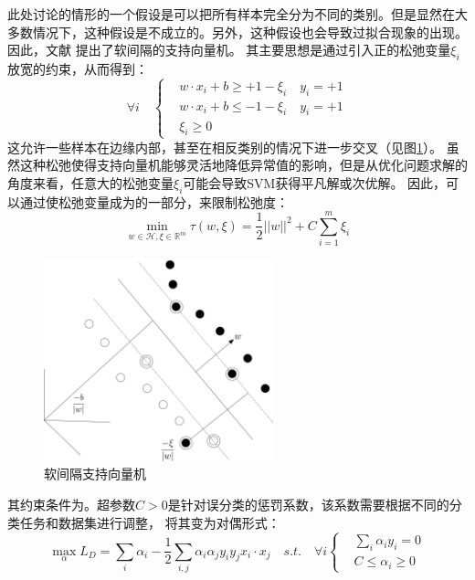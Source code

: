 此处讨论的情形的一个假设是可以把所有样本完全分为不同的类别。但是显然在大多数情况下，这种假设是不成立的。另外，这种假设也会导致过拟合现象的出现。因此，文献 \cite{cortes1995support} 提出了软间隔的支持向量机。
其主要思想是通过引入正的松弛变量$\xi_i$放宽的约束，从而得到：
\begin{equation}
	\forall i \quad
	\left\{
	 \begin{aligned}
	&w\cdot x_i + b \geq +1-\xi_i \quad y_i=+1  \\
	&w\cdot x_i + b \leq -1-\xi_i \quad y_i=+1  \\
	&\xi_i \geq 0
	\end{aligned}
	 \right.
	\label{equ:constraint_soft}
\end{equation}
这允许一些样本在边缘内部，甚至在相反类别的情况下进一步交叉（见图\ref{fig:softmargin}）。 虽然这种松弛使得支持向量机能够灵活地降低异常值的影响，但是从优化问题求解的角度来看，任意大的松弛变量$\xi_i$可能会导致SVM获得平凡解或次优解。 因此，可以通过使松弛变量成为的一部分，来限制松弛度：
\begin{equation}
	\min \limits_{w\in \mathcal{H},\xi\in \mathbb{R}^m} \tau(w,\xi)=\frac{1}{2}||w||^2+C\sum_{i=1}^m {\xi_i}
\end{equation}
\begin{figure}[hbt]
	\centering
	\includegraphics[width=6.67cm]{figures/emitter/svm_soft}
	\caption{软间隔支持向量机}
	\label{fig:softmargin}
\end{figure}
其约束条件为。超参数$C>0$是针对误分类的惩罚系数，该系数需要根据不同的分类任务和数据集进行调整，
将其变为对偶形式：
\begin{equation}
	\max \limits_{\alpha} L_D=\sum_i{\alpha_i}-\frac{1}{2}\sum_{i,j}\alpha_i\alpha_jy_iy_jx_i\cdot x_j \quad s.t. \quad \forall i
	\left\{
		\begin{aligned}
	   &\sum_i{\alpha_iy_i}=0  \\
	   &C \leq \alpha_i \geq 0
	   \end{aligned}
		\right.
	\label{equ:cdotdual}
\end{equation}
